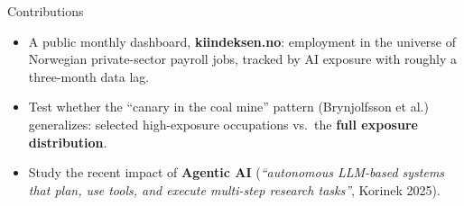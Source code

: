 \begin{frame}{Contributions}
\begin{itemize}\setlength{\itemsep}{8pt}
  \item A public monthly dashboard, \textbf{kiindeksen.no}: employment in the universe of Norwegian private-sector payroll jobs, tracked by AI exposure with roughly a three-month data lag.
  \item Test whether the ``canary in the coal mine'' pattern (Brynjolfsson et al.) generalizes: selected high-exposure occupations vs.\ the \textbf{full exposure distribution}.
  \item Study the recent impact of \textbf{Agentic AI} (\emph{``autonomous LLM-based systems that plan, use tools, and execute multi-step research tasks''}, Korinek 2025).
\end{itemize}
\end{frame}
